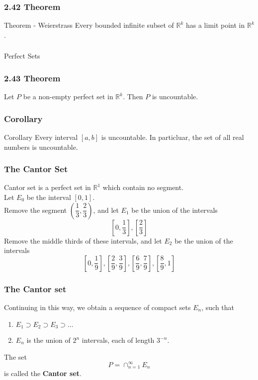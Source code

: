 \documentclass{beamer}
\begin{document}
\begin{frame}
    \frametitle{2.42 Theorem}

    \begin{block}{Theorem - Weierstrass}
        Every bounded infinite subset of \(\mathbb{R}^k\) has a limit point in \(\mathbb{R}^k\).
    \end{block}

\end{frame}

\begin{frame}
    \frametitle{}

        \Huge{Perfect Sets}

\end{frame}

\begin{frame}
    \frametitle{2.43 Theorem}

    Let \(P\) be a non-empty perfect set in \(\mathbb{R}^k\). Then \(P\) is uncountable. 

\end{frame}

\begin{frame}
    \frametitle{Corollary}

    \begin{block}{Corollary}
        Every interval \([a,b]\) is uncountable. In particluar, the set of all real numbers is uncountable. 
    \end{block}

\end{frame}

\begin{frame}
    \frametitle{The Cantor Set}

    Cantor set is a perfect set in \(\mathbb{R}^1\) which contain no segment. \\ \pause 
    \vspace{0.2in}
    Let \(E_0\) be the interval \([0,1]\). \\ \pause
    \vspace{0.2in}
    Remove the segment \(\left(\dfrac{1}{3}, \dfrac{2}{3}\right)\), and let \(E_1\) be the union of the intervals \[\left[0, \dfrac{1}{3}\right], \left[\dfrac{2}{3}\right]\]\pause
    Remove the middle thirds of these intervals, and let \(E_2\) be the union of the intervals \[\left[0, \dfrac{1}{9}\right], \left[\dfrac{2}{9}, \dfrac{3}{9}\right],\left[\dfrac{6}{9}, \dfrac{7}{9}\right],\left[\dfrac{8}{9}, 1\right]\]


\end{frame}

\begin{frame}
    \frametitle{The Cantor set}

    Continuing in this way, we obtain a sequence of compact sets \(E_n\), such that \begin{enumerate}
        \item \(E_1 \supset E_2 \supset E_3 \supset \dots\)
        \item \(E_n\) is the union of \(2^n\) intervals, each of length \(3^{-n}\).
    \end{enumerate}
The set \[P = \cap_{n=1}^\infty E_n\] is called the \textbf{Cantor set}.
\end{frame}
\end{document}
